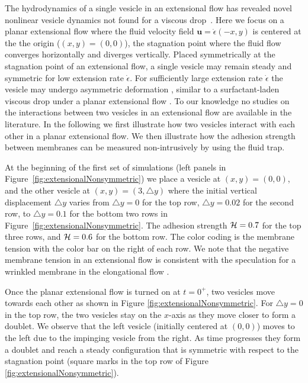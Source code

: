 \documentclass[prf,superscriptaddress,showkeys,longbibliography]{revtex4-1}
\newcommand{\uu}{\mathbf{u}}
\begin{document}
The hydrodynamics of a single vesicle in an extensional flow has
revealed novel nonlinear vesicle dynamics not found for a viscous
drop~\cite{KantslerSegreSteinberg2008_PRL, ZhaoShaqfeh2013_JFM,
Narsimhan2014_JFM, DahlNarsimhanGouveia2016_SoftMatt}.  Here we focus on a
planar extensional flow  where the fluid velocity field $\uu=\dot\epsilon(-x,y)$ is centered at the 
the origin ($(x,y)=(0,0)$), the stagnation point where the fluid flow converges horizontally and diverges vertically.
Placed symmetrically at the stagnation point of an extensional flow,
a single vesicle may remain steady and symmetric for low extension rate $\dot\epsilon$.
For sufficiently large extension rate $\dot\epsilon$ the vesicle may undergo asymmetric deformation \cite{KantslerSegreSteinberg2008_PRL,Narsimhan2014_JFM,DahlNarsimhanGouveia2016_SoftMatt}, 
similar to a surfactant-laden viscous drop under a planar extensional flow \cite{JanssenBoonAgterof1997_AIChE,HuPineLeal2000_PoF}.
To our knowledge no studies on the interactions between two vesicles in an extensional flow are available in the literature.
In the following we first illustrate how two vesicles interact with each other in a planar extensional flow. We then illustrate how the adhesion strength between membranes can be
measured non-intrusively by using the fluid trap.

At the beginning of the first set of simulations (left panels in Figure~\ref{fig:extensionalNonsymmetric})
we place a vesicle at $(x,y)=(0,0)$, 
and the other vesicle at $(x,y) = (3,\triangle y)$ where the initial vertical displacement $\triangle y$ varies from
$\triangle y=0$ for the top row, $\triangle y = 0.02$ for the second row, to
$\triangle y =0.1$ for the bottom two rows in Figure~\ref{fig:extensionalNonsymmetric}.
The adhesion strength ${\cal H} = 0.7$ for the top three rows, and ${\cal H} =0.6$ for the bottom row.
The color coding is the membrane tension with the color bar on the right of each row. We note that the negative membrane tension in an
extensional flow is consistent with the speculation for a wrinkled membrane in the elongational flow \cite{KantslerSegreSteinberg2007_PRL}.

Once the planar extensional flow is turned on at $t=0^+$, two vesicles move
towards each other  as shown in  Figure \ref{fig:extensionalNonsymmetric}.
For $\triangle y=0$ in the top row, the two vesicles stay on the $x$-axis as they move closer to 
form a doublet. We observe that the left vesicle (initially centered at $(0,0)$) moves to the left due to the impinging
vesicle from the right. As time progresses they form a doublet
and reach a steady configuration that is symmetric with respect to the stagnation point 
(square marks in the top row of Figure \ref{fig:extensionalNonsymmetric}).
\end{document}
